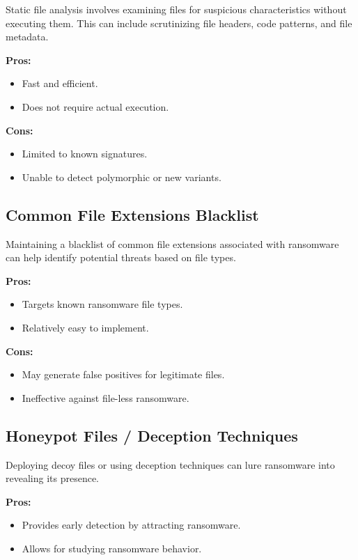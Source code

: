 \documentclass[12pt,twocolumn]{article}
\begin{document}
Static file analysis involves examining files for suspicious characteristics without executing them. This can include scrutinizing file headers, code patterns, and file metadata.

\textbf{Pros:}
\begin{itemize}
  \item Fast and efficient.
  \item Does not require actual execution.
\end{itemize}

\textbf{Cons:}
\begin{itemize}
  \item Limited to known signatures.
  \item Unable to detect polymorphic or new variants.
\end{itemize}

\subsection{Common File Extensions Blacklist}

Maintaining a blacklist of common file extensions associated with ransomware can help identify potential threats based on file types.

\textbf{Pros:}
\begin{itemize}
  \item Targets known ransomware file types.
  \item Relatively easy to implement.
\end{itemize}

\textbf{Cons:}
\begin{itemize}
  \item May generate false positives for legitimate files.
  \item Ineffective against file-less ransomware.
\end{itemize}

\subsection{Honeypot Files / Deception Techniques}

Deploying decoy files or using deception techniques can lure ransomware into revealing its presence.

\textbf{Pros:}
\begin{itemize}
  \item Provides early detection by attracting ransomware.
  \item Allows for studying ransomware behavior.
\end{itemize}
\end{document}
